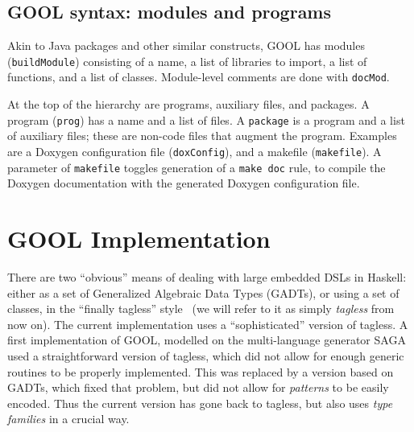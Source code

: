 \documentclass[sigplan,review,anonymous,prologue,dvipsnames]{acmart}
\newcommand{\Cplusplus}{C\texttt{++}}
\begin{document}
\subsection{GOOL syntax: modules and programs}

Akin to Java packages and other similar constructs, GOOL has modules
(\verb|buildModule|) consisting of a name, a list of libraries to import,
a list of functions, and a list of classes. Module-level comments are done
with \verb|docMod|.

At the top of the hierarchy are programs, auxiliary files, and packages. A
program (\verb|prog|) has a name and a list of files.  A \verb|package| is a
program and a list of auxiliary files; these are non-code files that
augment the program. Examples are a Doxygen configuration file
(\verb|doxConfig|), and a makefile (\verb|makefile|).  A parameter of
\verb|makefile| toggles generation of a \verb|make doc| rule, to
compile the Doxygen documentation with the generated Doxygen configuration
file.

\section{GOOL Implementation} \label{sec:implementation}

There are two ``obvious'' means of dealing with large embedded DSLs in Haskell:
either as a set of Generalized Algebraic Data Types (GADTs), or using a set of
classes, in the ``finally tagless'' style~\cite{carette2009finally} (we will
refer to it as simply \emph{tagless} from now on).  The current implementation
uses a ``sophisticated'' version of tagless. A first implementation of GOOL,
modelled on the multi-language generator SAGA~\cite{beyak2011saga} used a
straightforward version of tagless, which did not allow for enough generic
routines to be properly implemented.  This was replaced by a version based on
GADTs, which fixed that problem, but did not allow for \emph{patterns} to be
easily encoded. Thus the current version has gone back to tagless, but also uses
\emph{type families} in a crucial way.
\end{document}
